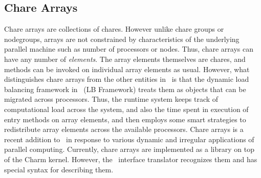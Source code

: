 \subsection{Chare Arrays}

Chare arrays are collections of chares. However unlike chare groups or
nodegroups, arrays are not constrained by characteristics of the underlying
parallel machine such as number of processors or nodes. Thus, chare arrays can
have any number of {\em elements}. The array elements themselves are chares,
and methods can be invoked on individual array elements as usual. However, what
distinguishes chare arrays from the other entities in \charmpp\ is that the
dynamic load balancing framework in \charmpp\ (LB Framework) treats them as
objects that can be migrated across processors. Thus, the runtime system keeps
track of computational load across the system, and also the time spent in
execution of entry methods on array elements, and then employs some smart
strategies to redistribute array elements across the available processors.
Chare arrays is a recent addition to \charmpp\ in response to various dynamic
and irregular applications of parallel computing. Currently, chare arrays are
implemented as a library on top of the Charm kernel. However, the \charmpp\
interface translator recognizes them and has special syntax for describing
them.

